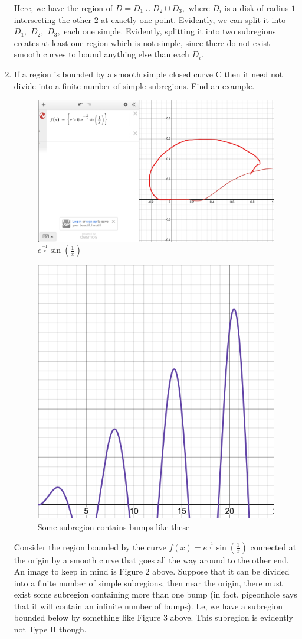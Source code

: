 \documentclass[11pt]{article}
\begin{document}
\begin{enumerate}
\begin{solution}
Here, we have the region of $D = D_1 \cup D_2 \cup D_3,$ where $D_i$ is a disk of radius $1$ intersecting the other $2$ at exactly one point. Evidently, we can split it into $D_1,$ $D_2,$ $D_3,$ each one simple. Evidently, splitting it into two subregions creates at least one region which is not simple, since there do not exist smooth curves to bound anything else than each $D_i.$
\end{solution}
\item 
\begin{problem}
    If a region is bounded by a smooth simple closed curve C then it need not
 divide into a finite number of simple subregions. Find an example.
\end{problem}
\begin{figure}[h!]
        \centering
        \includegraphics[width=0.5\linewidth]{Images/7.1.png}
        \caption{$e^{\frac{-1}{x}}\sin(\frac{1}{x})$}
    \end{figure}
    \begin{figure}
        \centering
        \includegraphics[width=0.25\linewidth]{Images/7.2.png}
        \caption{Some subregion contains bumps like these}
    \end{figure}
\begin{solution}
    Consider the region bounded by the curve
    $f(x) = e^{\frac{-1}{x}}\sin(\frac{1}{x})$ connected at the origin by a smooth curve that goes all the way around to the other end. An image to keep in mind is Figure 2 above. Suppose that it can be divided into a finite number of simple subregions, then near the origin, there must exist some subregion containing more than one bump (in fact, pigeonhole says that it will contain an infinite number of bumps). I.e, we have a subregion bounded below by something like Figure 3 above. This subregion is evidently not Type II though. 

\end{solution}
\end{enumerate}
\end{document}
